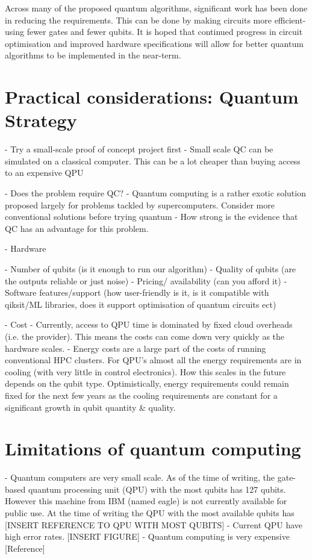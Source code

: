 \documentclass{book}
\begin{document}
Across many of the proposed quantum algorithms, significant work has been done in reducing the requirements. This can be done by making circuits more efficient- using fewer gates and fewer qubits.  It is hoped that continued progress in circuit optimisation and improved hardware specifications will allow for better quantum algorithms to be implemented in the near-term. 


\section{Practical considerations: Quantum Strategy}

- Try a small-scale proof of concept project first 
    - Small scale QC can be simulated on a classical computer. This can be a lot cheaper than buying access to an expensive QPU


- Does the problem require QC?
    - Quantum computing is a rather exotic solution proposed largely for problems tackled by supercomputers. Consider more conventional solutions before trying quantum
    - How strong is the evidence that QC has an advantage for this problem. 

- Hardware 

    - Number of qubits (is it enough to run our algorithm)
    - Quality of qubits (are the outputs reliable or just noise)
    - Pricing/ availability (can you afford it)
    - Software features/support (how user-friendly is it, is it compatible with qiksit/ML libraries, does it support optimisation of quantum circuits ect)


- Cost 
    - Currently, access to QPU time is dominated by fixed cloud overheads (i.e. the provider). This means the costs can come down very quickly as the hardware scales. 
    - Energy costs are a large part of the costs of running conventional HPC clusters. For QPU's almost all the energy requirements are in cooling (with very little in control electronics). How this scales in the future depends on the qubit type. Optimistically, energy requirements could remain fixed for the next few years as the cooling requirements are constant for a significant growth in qubit quantity \& quality. 

\section{Limitations of quantum computing}

- Quantum computers are very small scale. As of the time of writing, the gate-based quantum processing unit (QPU) with the most qubits has 127 qubits. However this machine from IBM (named eagle) is not currently available for public use. At the time of writing the QPU with the most available qubits has [INSERT REFERENCE TO QPU WITH MOST QUBITS]
- Current QPU have high error rates. [INSERT FIGURE]
- Quantum computing is very expensive [Reference]
\end{document}
